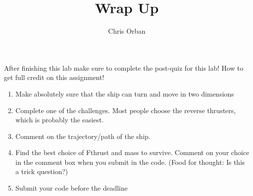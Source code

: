 \documentclass{ximera}
\author{Chris Orban}
\title{Wrap Up}
\begin{document}
\begin{abstract}
\end{abstract}
\maketitle

After finishing this lab make sure to complete the post-quiz for this
lab!  How to get full credit on this assignment!

\begin{enumerate}
\item Make absolutely sure that the ship can turn and move in two dimensions
\item Complete one of the challenges.  Most people choose the reverse thrusters, which is probably the easiest.
\item Comment on the trajectory/path of the ship.
\item Find the best choice of Fthrust and mass to survive.  Comment on your choice in the comment box when you submit in the code. (Food for thought: Is this a trick question?)
\item Submit your code before the deadline
\end{enumerate}
\end{document}
